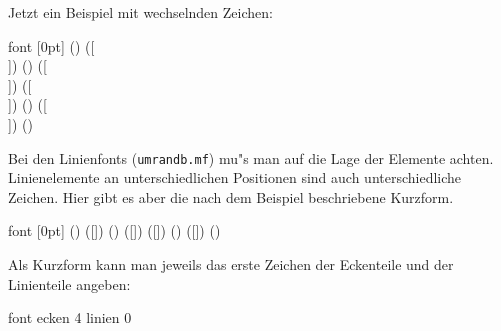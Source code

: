 Jetzt ein Beispiel mit wechselnden Zeichen:
\begin{bsp}
         font {\UA} [0pt]
         () ([\\]) ()
         ([\\])
         ([\\])
         () ([\\]) ()
\end{bsp}
\make

Bei den Linienfonts (\verb|umrandb.mf|) mu"s man auf die Lage der Elemente
achten. Linienelemente an unterschiedlichen Positionen sind auch
unterschiedliche Zeichen. Hier gibt es aber die nach dem Beispiel
beschriebene Kurzform.
\begin{bsp}
         font {\UB} [0pt]
         () ([]) ()
         ([]) ([])
         () ([]) ()
\end{bsp}
\make

Als Kurzform kann man jeweils das erste Zeichen der Eckenteile und der
Linienteile angeben:
\begin{bsp}
           font {\UB}
           ecken 4 linien 0
\end{bsp}
\make

